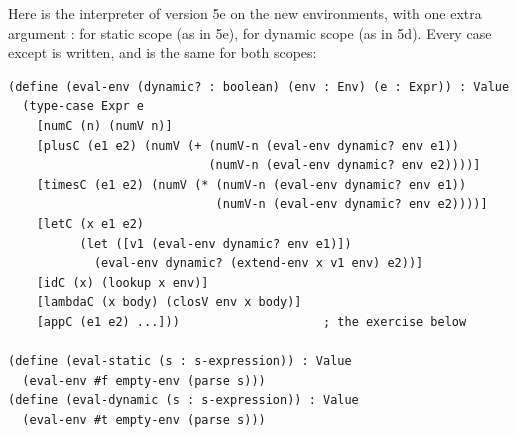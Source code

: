 Here is the interpreter of version 5e on the new environments, with one extra argument :  for static scope (as in 5e),  for dynamic scope (as in 5d). Every case except  is written, and is the same for both scopes:
\begin{lstlisting}
(define (eval-env (dynamic? : boolean) (env : Env) (e : Expr)) : Value
  (type-case Expr e
    [numC (n) (numV n)]
    [plusC (e1 e2) (numV (+ (numV-n (eval-env dynamic? env e1))
                            (numV-n (eval-env dynamic? env e2))))]
    [timesC (e1 e2) (numV (* (numV-n (eval-env dynamic? env e1))
                             (numV-n (eval-env dynamic? env e2))))]
    [letC (x e1 e2)
          (let ([v1 (eval-env dynamic? env e1)])
            (eval-env dynamic? (extend-env x v1 env) e2))]
    [idC (x) (lookup x env)]
    [lambdaC (x body) (closV env x body)]
    [appC (e1 e2) ...]))                    ; the exercise below

(define (eval-static (s : s-expression)) : Value
  (eval-env #f empty-env (parse s)))
(define (eval-dynamic (s : s-expression)) : Value
  (eval-env #t empty-env (parse s)))
\end{lstlisting}

